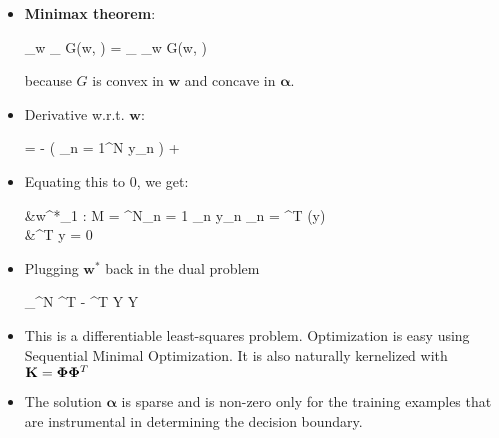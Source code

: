 \begin{itemize}
\begin{itemize}
		\item \textbf{Minimax theorem}: 
		\begin{myalign*}
		    \min_{\bm w} \max_{\bm \alpha} G(\bm w, \bm \alpha) = \max_{\bm \alpha} \min_{\bm w} G(\bm w, \bm \alpha)
		\end{myalign*}
		because $G$ is convex in $\bm w$ and concave in $\bm \alpha$.
		\item Derivative w.r.t. $\bm w$:
		\begin{myalign*}
		     = - 
		    \left(
		    	\sum_{n = 1}^N \alpha y_n \tilde{\phi_n}
		    \right)
		    + 
		    \left[
		    	\begin{array}{c}
		    		0 \\ \bm w_{1 : M}
		    	\end{array}
		    \right]
		\end{myalign*}
		\item Equating this to 0, we get:
			\begin{myalign*}
			    &\bm w^*_{1 : M} = \sum^N_{n = 1} \alpha_n y_n \phi_n = \bm \Phi^T (\*y) \bm \alpha\\
			    &\bm \alpha^T \*y = 0
			\end{myalign*}
		\item Plugging $\bm w^*$ back in the dual problem
		\begin{myalign*}
		    \max_{\bm \alpha \in [0, C]^N} \bm \alpha^T  -  \bm \alpha^T \*Y \bm \Phi \bm \Phi \* Y \bm \alpha
		\end{myalign*}
		\item This is a differentiable least-squares problem. Optimization is easy using Sequential Minimal Optimization. It is also naturally kernelized with $\mathbf{K} = \bm \Phi \bm \Phi^T$
		\item The solution $\bm \alpha$ is sparse and is non-zero only for the training examples that are instrumental in determining the decision boundary.
	\end{itemize}
\end{itemize}


